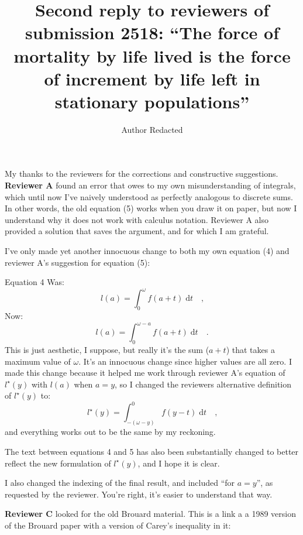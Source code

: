 \documentclass{article}
\newcommand{\dd}{\; \mathrm{d}}
\begin{document}
\title{Second reply to reviewers of submission 2518: ``The force of mortality by
life lived is the force of increment by life left in stationary populations''}
\author{Author Redacted}
\maketitle

My thanks to the reviewers for the corrections and constructive suggestions.
\textbf{Reviewer A} found an error that owes to my own misunderstanding of
integrals, which until now I've naively understood as perfectly analogous to discrete sums.
In other words, the old equation (5) works when you draw it on paper, but now I
understand why it does not work with calculus notation. Reviewer A also
provided a solution that saves the argument, and for which I am grateful.

I've only made yet another innocuous change to both my own equation (4) and
reviewer A's suggestion for equation (5):

Equation 4 Was:
\begin{equation}
\label{eq:la}
l(a) = \int _{0}^{\omega} f(a+t) \dd t \quad \text{,}
\end{equation}
Now:
\begin{equation}
\label{eq:la}
l(a) = \int _{0}^{\omega-a} f(a+t) \dd t \quad \text{.}
\end{equation}
This is just aesthetic, I suppose, but really it's the sum ($a+t$)
that takes a maximum value of $\omega$. It's an innocuous change since higher
values are all zero. I made this change because it helped me work through reviewer A's
equation of $l^\star (y)$ with $l(a)$ when $a=y$, so I changed the reviewers
alternative definition of $l^\star (y)$ to:
\begin{equation}
\label{eq:lstar}
l^\star (y) = \int _{-(\omega - y)}^0 f(y-t) \dd t \quad \text{,}
\end{equation}
and everything works out to be the same by my reckoning.

The text between equations 4 and 5 has also been substantially changed to
better reflect the new formulation of $l^\star (y)$, and I hope it is clear.

I also changed the indexing of the final result, and included ``for $a=y$'', as
requested by the reviewer. You're right, it's easier to understand that way.

\textbf{Reviewer C} looked for the old Brouard material. This is a link a a
1989 version of the Brouard paper with a version of Carey's inequality in it:
\end{document}
